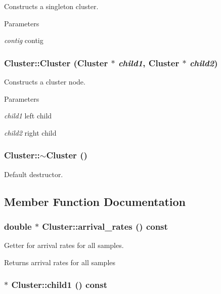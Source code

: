 Constructs a singleton cluster. 
\begin{DoxyParams}{Parameters}
\item[{\em contig}]contig \end{DoxyParams}
\hypertarget{classCluster_aa742def049dabe95e607db51d6a51333}{
\subsubsection[{Cluster}]{\setlength{\rightskip}{0pt plus 5cm}Cluster::Cluster ({\bf Cluster} $\ast$ {\em child1}, \/  {\bf Cluster} $\ast$ {\em child2})}}
\label{classCluster_aa742def049dabe95e607db51d6a51333}


Constructs a cluster node. 
\begin{DoxyParams}{Parameters}
\item[{\em child1}]left child \item[{\em child2}]right child \end{DoxyParams}
\hypertarget{classCluster_a4bddfc88ac859610acab15dd12851b58}{
\subsubsection[{$\sim$Cluster}]{\setlength{\rightskip}{0pt plus 5cm}Cluster::$\sim$Cluster ()}}
\label{classCluster_a4bddfc88ac859610acab15dd12851b58}
Default destructor. 

\subsection{Member Function Documentation}
\hypertarget{classCluster_a5aed14194ba43130e15731839abeef3e}{
\subsubsection[{arrival\_\-rates}]{\setlength{\rightskip}{0pt plus 5cm}double $\ast$ Cluster::arrival\_\-rates () const}}
\label{classCluster_a5aed14194ba43130e15731839abeef3e}


Getter for arrival rates for all samples. \begin{DoxyReturn}{Returns}
arrival rates for all samples 
\end{DoxyReturn}
\hypertarget{classCluster_a67e3c2f7587d7e94e2113fa6017e56d5}{
\subsubsection[{child1}]{ $\ast$ Cluster::child1 () const}}
\label{classCluster_a67e3c2f7587d7e94e2113fa6017e56d5}



